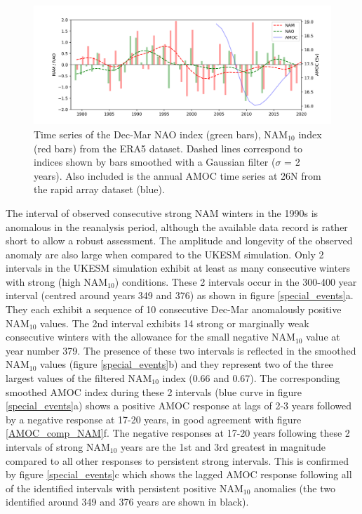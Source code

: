 \begin{figure}[h!]
\begin{center}
\noindent\includegraphics[width = 0.9\linewidth]{Figures/Figures-surface/ERA5_series_allf.png} \caption[Time series of NAO, NAM$_{10}$ and AMOC from the ERA5 and  RAPID array datasets]{Time series of the Dec-Mar NAO index (green bars), NAM$_{10}$ index (red bars) from the ERA5 dataset. Dashed lines correspond to indices shown by bars smoothed with a Gaussian filter ($\sigma$ = 2 years). Also included is the annual AMOC time series at 26N from the rapid array dataset (blue).}
\label{ERA5_series}
\end{center}
\end{figure}

The interval of observed consecutive strong NAM winters in the 1990s is anomalous in the reanalysis period, although the available data record is rather short to allow a robust assessment. The amplitude and longevity of the observed anomaly are also large when compared to the UKESM simulation. Only 2 intervals in the UKESM simulation exhibit at least as many consecutive winters with strong (high NAM$_{10}$) conditions. These 2 intervals occur in the 300-400 year interval (centred around years 349 and 376) as shown in figure \ref{special_events}a. They each exhibit a sequence of 10 consecutive Dec-Mar anomalously positive NAM$_{10}$ values. The 2nd interval exhibits 14 strong or marginally weak consecutive winters with the allowance for the small negative NAM$_{10}$ value at year number 379. The presence of these two intervals is reflected in the smoothed NAM$_{10}$ values (figure \ref{special_events}b) and they represent two of the three largest values of the filtered NAM$_{10}$ index (0.66 and 0.67). The corresponding smoothed AMOC index during these 2 intervals (blue curve in figure \ref{special_events}a) shows a positive AMOC response at lags of 2-3 years followed by a negative response at 17-20 years, in good agreement with figure \ref{AMOC_comp_NAM}f. The negative responses at 17-20 years following these 2 intervals of strong NAM$_{10}$ years are the 1st and 3rd greatest in magnitude compared to all other responses to persistent strong intervals. This is confirmed by figure \ref{special_events}c which shows the lagged AMOC response following all of the identified intervals with persistent positive NAM$_{10}$ anomalies (the two identified around 349 and 376 years are shown in black). 

